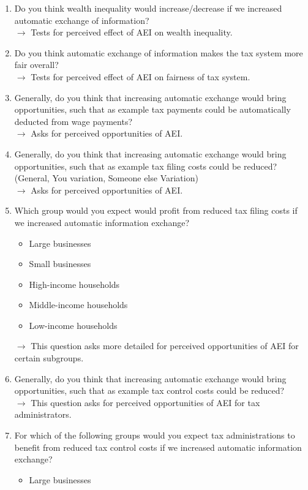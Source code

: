 \documentclass[12pt]{article}
\begin{document}
\begin{enumerate}
    \item Do you think wealth inequality would increase/decrease if we increased automatic exchange of information? \\ $\rightarrow$ Tests for perceived effect of AEI on wealth inequality. 
    \item Do you think automatic exchange of information makes the tax system more fair overall? \\ $\rightarrow$ Tests for perceived effect of AEI on fairness of tax system.
    \item Generally, do you think that increasing automatic exchange would bring opportunities, such that as example  tax payments could be automatically deducted from wage payments? \\ $\rightarrow$ Asks for perceived opportunities of AEI.
    \item Generally, do you think that increasing automatic exchange would bring opportunities, such that as example tax filing costs could be reduced? (General, You variation, Someone else Variation) \\ $\rightarrow$ Asks for perceived opportunities of AEI.
    \item Which group would you expect would profit from reduced tax filing costs if we increased automatic information exchange?
    \begin{itemize}
        \item Large businesses
        \item Small businesses
        \item High-income households
        \item Middle-income households
        \item Low-income households
    \end{itemize} $\rightarrow$ This question asks more detailed for perceived opportunities of AEI for certain subgroups.
    \item Generally, do you think that increasing automatic exchange would bring opportunities, such that as example tax control costs could be reduced? \\ $\rightarrow$ This question asks for perceived opportunities of AEI for tax administrators.
    \item For which of the following groups would you expect tax administrations to benefit from reduced tax control costs if we increased automatic information exchange?
    \begin{itemize}
        \item Large businesses

\end{itemize}
\end{enumerate}
\end{document}
